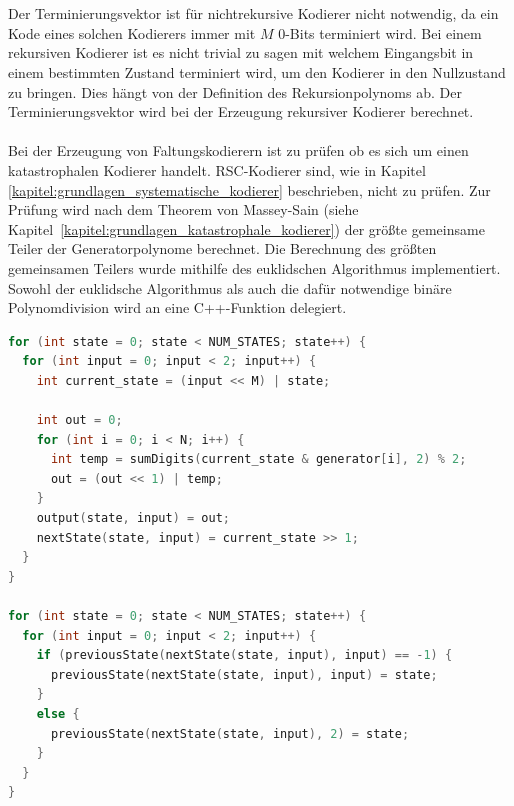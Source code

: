 \\
\\
Der Terminierungsvektor ist für nichtrekursive Kodierer nicht notwendig, da ein Kode eines solchen Kodierers immer mit $M$ 0-Bits terminiert wird. Bei einem rekursiven Kodierer ist es nicht trivial zu sagen mit welchem Eingangsbit in einem bestimmten Zustand terminiert wird, um den Kodierer in den Nullzustand zu bringen. Dies hängt von der Definition des Rekursionpolynoms ab. Der Terminierungsvektor wird bei der Erzeugung rekursiver Kodierer berechnet.
\\
\\
Bei der Erzeugung von Faltungskodierern ist zu prüfen ob es sich um einen katastrophalen Kodierer handelt. RSC-Kodierer sind, wie in Kapitel \ref{kapitel:grundlagen_systematische_kodierer} beschrieben, nicht zu prüfen. Zur Prüfung wird nach dem Theorem von Massey-Sain (siehe Kapitel~\ref{kapitel:grundlagen_katastrophale_kodierer}) der größte gemeinsame Teiler der Generatorpolynome berechnet. Die Berechnung des größten gemeinsamen Teilers wurde mithilfe des euklidschen Algorithmus implementiert. Sowohl der euklidsche Algorithmus als auch die dafür notwendige binäre Polynomdivision wird an eine C++-Funktion delegiert.
\begin{lstlisting}[language=C++,caption=Codeausschnitt aus der Implementierung der C++-Funktion zur Erzeugung von Faltungskodierer, label={lst:generate_coder}, float=!th, basicstyle=\ttfamily\scriptsize]
for (int state = 0; state < NUM_STATES; state++) {
  for (int input = 0; input < 2; input++) {
    int current_state = (input << M) | state;

    int out = 0;
    for (int i = 0; i < N; i++) {
      int temp = sumDigits(current_state & generator[i], 2) % 2;
      out = (out << 1) | temp;
    }
    output(state, input) = out;
    nextState(state, input) = current_state >> 1;
  }
}

for (int state = 0; state < NUM_STATES; state++) {
  for (int input = 0; input < 2; input++) {
    if (previousState(nextState(state, input), input) == -1) {
      previousState(nextState(state, input), input) = state;
    }
    else {
      previousState(nextState(state, input), 2) = state;
    }
  }
}
\end{lstlisting}

